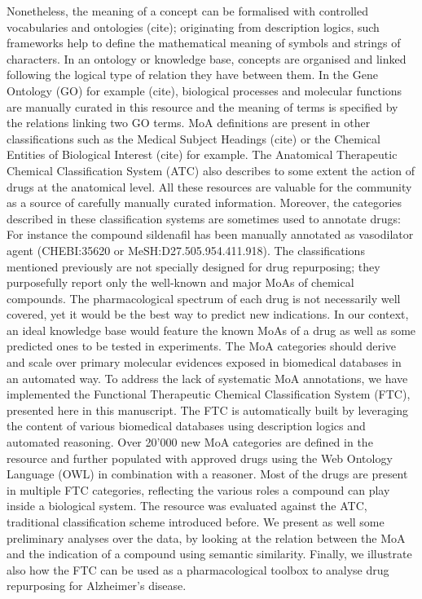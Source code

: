 \documentclass{bioinfo}
\begin{document}
Nonetheless, the meaning of a concept can be formalised with controlled vocabularies and ontologies (cite); originating from description logics, such frameworks help to define the mathematical meaning of symbols and strings of characters. In an ontology or knowledge base, concepts are organised and linked following the logical type of relation they have between them. In the Gene Ontology (GO) for example (cite), biological processes and molecular functions are manually curated in this resource and the meaning of terms is specified by the relations linking two GO terms.
MoA definitions are present in other classifications such as the Medical Subject Headings (cite) or the Chemical Entities of 
Biological Interest (cite) for example. The Anatomical Therapeutic Chemical Classification System (ATC) also describes to some 
extent the action of drugs at the anatomical level. All these resources are valuable for the community as a source of carefully 
manually curated information. Moreover, the categories described in these classification systems are sometimes used to annotate 
drugs: For instance the compound sildenafil has been manually annotated as vasodilator agent (CHEBI:35620 or MeSH:D27.505.954.411.918).
The classifications mentioned previously are not specially designed for drug repurposing; they purposefully report only the 
well-known and major MoAs of chemical compounds. The pharmacological spectrum of each drug is not necessarily well covered, yet 
it would be the best way to predict new indications. In our context, an ideal knowledge base would feature the known MoAs of a 
drug as well as some predicted ones to be tested in experiments. The MoA categories should derive and scale over primary molecular 
evidences exposed in biomedical databases in an automated way.
To address the lack of systematic MoA annotations, we have implemented the Functional Therapeutic Chemical 
Classification System (FTC), presented here in this manuscript. The FTC is automatically built by leveraging the content 
of various biomedical databases using description logics and automated reasoning. Over 20’000 new MoA categories are defined 
in the resource and further populated with approved drugs using the Web Ontology Language (OWL) in combination with a reasoner. 
Most of the drugs are present in multiple FTC categories, reflecting the various roles a compound can play inside a biological system. 
The resource was evaluated against the ATC, traditional classification scheme introduced before. We present as well some preliminary 
analyses over the data, by looking at the relation between the MoA and the indication of a compound using semantic similarity. 
Finally, we illustrate also how the FTC can be used as a pharmacological toolbox to analyse drug repurposing for Alzheimer’s disease.
\end{document}
